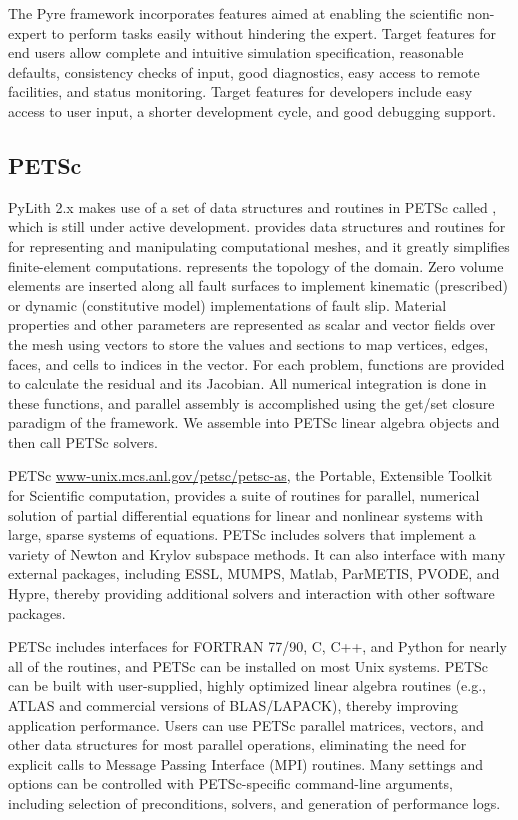 The Pyre framework incorporates features aimed at enabling the
scientific non-expert to perform tasks easily without hindering the
expert. Target features for end users allow complete and intuitive
simulation specification, reasonable defaults, consistency checks of
input, good diagnostics, easy access to remote facilities, and status
monitoring. Target features for developers include easy access to user
input, a shorter development cycle, and good debugging support.


\subsection{PETSc}

PyLith 2.x makes use of a set of data structures and routines in PETSc
called , which is still under active
development.  provides data structures and routines for
for representing and manipulating computational meshes, and it greatly
simplifies finite-element computations. represents the
topology of the domain. Zero volume elements are inserted along all
fault surfaces to implement kinematic (prescribed) or dynamic
(constitutive model) implementations of fault slip. Material
properties and other parameters are represented as scalar and vector
fields over the mesh using vectors to store the values and sections to
map vertices, edges, faces, and cells to indices in the vector. For
each problem, functions are provided to calculate the residual and its
Jacobian.  All numerical integration is done in these functions, and
parallel assembly is accomplished using the get/set closure paradigm
of the  framework. We assemble into PETSc linear
algebra objects and then call PETSc solvers.

PETSc \url{www-unix.mcs.anl.gov/petsc/petsc-as}, the Portable,
Extensible Toolkit for Scientific computation, provides a suite of
routines for parallel, numerical solution of partial differential
equations for linear and nonlinear systems with large, sparse systems
of equations.  PETSc includes solvers that implement a variety of
Newton and Krylov subspace methods. It can also interface with many
external packages, including ESSL, MUMPS, Matlab, ParMETIS, PVODE, and
Hypre, thereby providing additional solvers and interaction with other
software packages.

PETSc includes interfaces for FORTRAN 77/90, C, C++, and Python for
nearly all of the routines, and PETSc can be installed on most Unix
systems. PETSc can be built with user-supplied, highly optimized
linear algebra routines (e.g., ATLAS and commercial versions of
BLAS/LAPACK), thereby improving application performance. Users can use
PETSc parallel matrices, vectors, and other data structures for most
parallel operations, eliminating the need for explicit calls to
Message Passing Interface (MPI) routines. Many settings and options
can be controlled with PETSc-specific command-line arguments,
including selection of preconditions, solvers, and generation of
performance logs.
